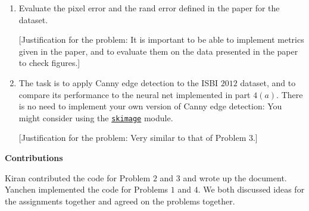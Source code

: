 \documentclass[12pt]{article}
\begin{document}
\begin{enumerate}
\item Evaluate the pixel error and the rand error defined in the paper for the dataset. 

[Justification for the problem: It is important to be able to implement metrics given in the paper, and to evaluate them on the data presented in the paper to check figures.]

\item The task is to apply Canny edge detection to the ISBI $2012$ dataset, and to compare its performance to the neural net implemented in part $4(a)$. There is no need to implement your own version of Canny edge detection: You might consider using the \href{http://scikit-image.org/docs/dev/auto_examples/plot_canny.html}{\texttt{skimage}} module. 

[Justification for the problem: Very similar to that of Problem $3$.]

\end{enumerate}


\vspace{0.3in}

\large\textbf{Contributions}

Kiran contributed the code for Problem $2$ and $3$ and wrote up the document. 
Yanchen implemented the code for Problems $1$ and $4$. We both discussed ideas for the assignments together and agreed on the problems together.
\end{document}
